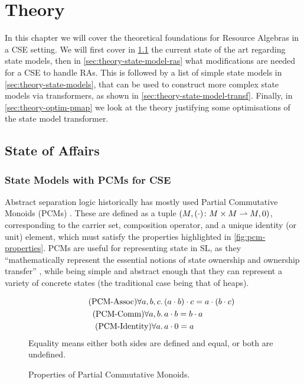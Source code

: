 \chapter{Theory} \label{chap:theory}

In this chapter we will cover the theoretical foundations for Resource Algebras in a CSE setting. We will first cover in \cref{sec:theory-state-of-affairs} the current state of the art regarding state models, then in \cref{sec:theory-state-model-ras} what modifications are needed for a CSE to handle RAs. This is followed by a list of simple state models in \cref{sec:theory-state-models}, that can be used to construct more complex state models via transformers, as shown in \cref{sec:theory-state-model-transf}. Finally, in \cref{sec:theory-optim-pmap} we look at the theory justifying some optimisations of the \PMap{} state model transformer.

\section{State of Affairs} \label{sec:theory-state-of-affairs}

\subsection{State Models with PCMs for CSE}

Abstract separation logic historically has mostly used Partial Commutative Monoids (PCMs) \cite{abstractseplogic,sepalgebra,iris1,higherorderseplogic}. These are defined as a tuple ${(M, (\cdot)\colon M\times M\rightharpoonup M, 0)}$, corresponding to the carrier set, composition operator, and a unique identity (or unit) element, which must satisfy the properties highlighted in \autoref{fig:pcm-properties}. PCMs are useful for representing state in SL, as they ``mathematically represent the essential notions of state ownership and ownership transfer'' \cite{abstractpcm}, while being simple and abstract enough that they can represent a variety of concrete states (the traditional case being that of heaps).

\begin{figure}
	\centering
	\begin{align*}
	\tag{PCM-Assoc} \forall a,b,c&\ldotp (a\cdot b)\cdot c = a\cdot (b\cdot c)\\
	\tag{PCM-Comm} \forall a,b&\ldotp a\cdot b = b\cdot a\\
	\tag{PCM-Identity} \forall a&\ldotp a\cdot 0 = a
	\end{align*}
	Equality means either both sides are defined and equal, or both are undefined.
	\caption{Properties of Partial Commutative Monoids.}
	\label{fig:pcm-properties}
\end{figure}

